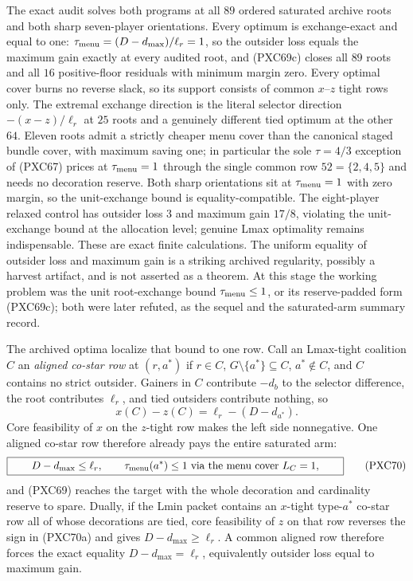 \documentclass[11pt]{article}
\begin{document}
The exact audit solves both programs at all $89$ ordered saturated archive
roots and both sharp seven-player orientations.  Every optimum is
exchange-exact and equal to one:
$\tau_{\rm menu}=(D-d_{\max})/\ell_r=1$, so the outsider loss equals the
maximum gain exactly at every audited root, and (PXC69c) closes all $89$
roots and all $16$ positive-floor residuals with minimum margin zero.
Every optimal cover burns no reverse slack, so its support consists of
common $x$--$z$ tight rows only.  The extremal exchange direction is the
literal selector direction $-(x-z)/\ell_r$ at $25$ roots and a genuinely
different tied optimum at the other $64$.  Eleven roots admit a strictly
cheaper menu cover than the canonical staged bundle cover, with maximum
saving one; in particular the sole $\tau=4/3$ exception of (PXC67) prices
at $\tau_{\rm menu}=1$ through the single common row $52=\{2,4,5\}$ and
needs no decoration reserve.  Both sharp orientations sit at
$\tau_{\rm menu}=1$ with zero margin, so the unit-exchange bound is
equality-compatible.  The eight-player relaxed control has outsider loss
$3$ and maximum gain $17/8$, violating the unit-exchange bound at the
allocation level; genuine Lmax optimality remains indispensable.  These are
exact finite calculations.  The uniform equality of outsider loss and
maximum gain is a striking archived regularity, possibly a harvest
artifact, and is not asserted as a theorem.  At this stage the working
problem was the unit root-exchange bound $\tau_{\rm menu}\le1$, or its
reserve-padded form (PXC69c); both were later refuted, as the sequel and
the saturated-arm summary record.

The archived optima localize that bound to one row.  Call an Lmax-tight
coalition $C$ an \emph{aligned co-star row} at $(r,a^*)$ if $r\in C$,
$G\setminus\{a^*\}\subseteq C$, $a^*\notin C$, and $C$ contains no strict
outsider.  Gainers in $C$ contribute $-d_b$ to the selector difference,
the root contributes $\ell_r$, and tied outsiders contribute nothing, so
\[
 x(C)-z(C)=\ell_r-(D-d_{a^*}).                       \tag{PXC70a}
\]
Core feasibility of $x$ on the $z$-tight row makes the left side
nonnegative.  One aligned co-star row therefore already pays the entire
saturated arm:
\[
 \boxed{\qquad
 D-d_{\max}\le\ell_r,
 \qquad \tau_{\rm menu}(a^*)\le1
 \hbox{ via the menu cover } L_C=1,
 \qquad}                                             \tag{PXC70}
\]
and (PXC69) reaches the target with the whole decoration and cardinality
reserve to spare.  Dually, if the Lmin packet contains an $x$-tight
type-$a^*$ co-star row all of whose decorations are tied, core feasibility
of $z$ on that row reverses the sign in (PXC70a) and gives
$D-d_{\max}\ge\ell_r$.  A common aligned row therefore forces the exact
equality $D-d_{\max}=\ell_r$, equivalently outsider loss equal to maximum
gain.
\end{document}
